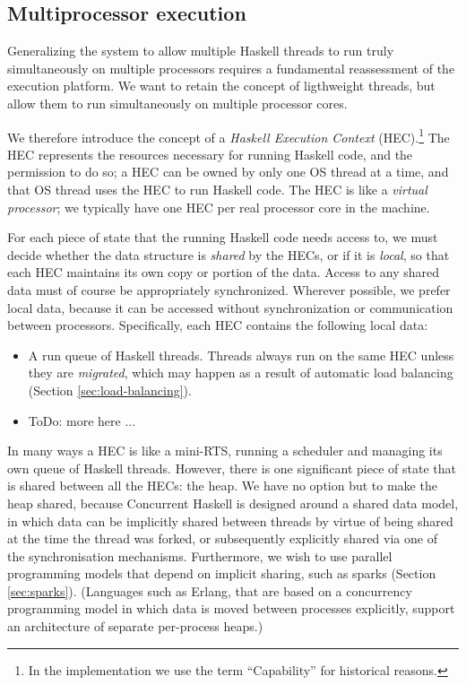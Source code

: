 \subsection{Multiprocessor execution}

Generalizing the system to allow multiple Haskell threads to run truly
simultaneously on multiple processors requires a fundamental
reassessment of the execution platform.  We want to retain the concept
of ligthweight threads, but allow them to run simultaneously on
multiple processor cores.

We therefore introduce the concept of a \emph{Haskell Execution
  Context} (HEC).\footnote{In the implementation we use the term
  ``Capability'' for historical reasons.}  The HEC represents the
resources necessary for running Haskell code, and the permission to do
so; a HEC can be owned by only one OS thread at a time, and that OS
thread uses the HEC to run Haskell code.  The HEC is like a
\emph{virtual processor}; we typically have one HEC per real processor
core in the machine.

For each piece of state that the running Haskell code needs access to,
we must decide whether the data structure is \emph{shared} by the
HECs, or if it is \emph{local}, so that each HEC maintains its
own copy or portion of the data.  Access to any shared data must of
course be appropriately synchronized.  Wherever possible, we prefer
local data, because it can be accessed without synchronization or
communication between processors.  Specifically, each HEC contains the
following local data:

\begin{itemize}
\item A run queue of Haskell threads.  Threads always run on the same
  HEC unless they are \emph{migrated}, which may happen as a result of
  automatic load balancing (Section \ref{sec:load-balancing}).
\item ToDo: more here ...
\end{itemize}

In many ways a HEC is like a mini-RTS, running a scheduler and
managing its own queue of Haskell threads.  However, there is one
significant piece of state that is shared between all the HECs: the
heap.  We have no option but to make the heap shared, because
Concurrent Haskell is designed around a shared data model, in which
data can be implicitly shared between threads by virtue of being
shared at the time the thread was forked, or subsequently explicitly
shared via one of the synchronisation mechanisms.  Furthermore, we
wish to use parallel programming models that depend on implicit
sharing, such as sparks (Section \ref{sec:sparks}). (Languages such as
Erlang, that are based on a concurrency programming model in which
data is moved between processes explicitly, support an architecture of
separate per-process heaps.)

